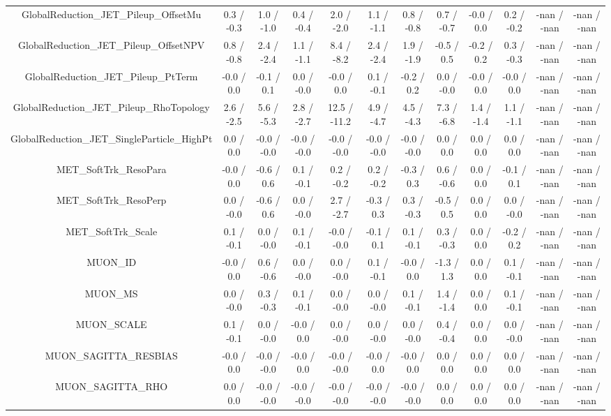 \begin{table}[htbp]
\begin{center}
\begin{tabular}{|c|c|c|c|c|c|c|c|c|c|c|c|}
  GlobalReduction_JET_Pileup_OffsetMu & 0.3 / -0.3 & 1.0 / -1.0 & 0.4 / -0.4 & 2.0 / -2.0 & 1.1 / -1.1 & 0.8 / -0.8 & 0.7 / -0.7 & -0.0 / 0.0 & 0.2 / -0.2 & -nan / -nan & -nan / -nan \\ 
  GlobalReduction_JET_Pileup_OffsetNPV & 0.8 / -0.8 & 2.4 / -2.4 & 1.1 / -1.1 & 8.4 / -8.2 & 2.4 / -2.4 & 1.9 / -1.9 & -0.5 / 0.5 & -0.2 / 0.2 & 0.3 / -0.3 & -nan / -nan & -nan / -nan \\ 
  GlobalReduction_JET_Pileup_PtTerm & -0.0 / 0.0 & -0.1 / 0.1 & 0.0 / -0.0 & -0.0 / 0.0 & 0.1 / -0.1 & -0.2 / 0.2 & 0.0 / -0.0 & -0.0 / 0.0 & -0.0 / 0.0 & -nan / -nan & -nan / -nan \\ 
  GlobalReduction_JET_Pileup_RhoTopology & 2.6 / -2.5 & 5.6 / -5.3 & 2.8 / -2.7 & 12.5 / -11.2 & 4.9 / -4.7 & 4.5 / -4.3 & 7.3 / -6.8 & 1.4 / -1.4 & 1.1 / -1.1 & -nan / -nan & -nan / -nan \\ 
  GlobalReduction_JET_SingleParticle_HighPt & 0.0 / 0.0 & -0.0 / -0.0 & -0.0 / -0.0 & -0.0 / -0.0 & -0.0 / -0.0 & -0.0 / -0.0 & 0.0 / 0.0 & 0.0 / 0.0 & 0.0 / 0.0 & -nan / -nan & -nan / -nan \\ 
  MET_SoftTrk_ResoPara & -0.0 / 0.0 & -0.6 / 0.6 & 0.1 / -0.1 & 0.2 / -0.2 & 0.2 / -0.2 & -0.3 / 0.3 & 0.6 / -0.6 & 0.0 / 0.0 & -0.1 / 0.1 & -nan / -nan & -nan / -nan \\ 
  MET_SoftTrk_ResoPerp & 0.0 / -0.0 & -0.6 / 0.6 & 0.0 / -0.0 & 2.7 / -2.7 & -0.3 / 0.3 & 0.3 / -0.3 & -0.5 / 0.5 & 0.0 / 0.0 & 0.0 / -0.0 & -nan / -nan & -nan / -nan \\ 
  MET_SoftTrk_Scale & 0.1 / -0.1 & 0.0 / -0.0 & 0.1 / -0.1 & -0.0 / -0.0 & -0.1 / 0.1 & 0.1 / -0.1 & 0.3 / -0.3 & 0.0 / 0.0 & -0.2 / 0.2 & -nan / -nan & -nan / -nan \\ 
  MUON_ID & -0.0 / 0.0 & 0.6 / -0.6 & 0.0 / -0.0 & 0.0 / -0.0 & 0.1 / -0.1 & -0.0 / 0.0 & -1.3 / 1.3 & 0.0 / 0.0 & 0.1 / -0.1 & -nan / -nan & -nan / -nan \\ 
  MUON_MS & 0.0 / -0.0 & 0.3 / -0.3 & 0.1 / -0.1 & 0.0 / -0.0 & 0.0 / -0.0 & 0.1 / -0.1 & 1.4 / -1.4 & 0.0 / 0.0 & 0.1 / -0.1 & -nan / -nan & -nan / -nan \\ 
  MUON_SCALE & 0.1 / -0.1 & 0.0 / -0.0 & -0.0 / 0.0 & 0.0 / -0.0 & 0.0 / -0.0 & 0.0 / -0.0 & 0.4 / -0.4 & 0.0 / 0.0 & 0.0 / -0.0 & -nan / -nan & -nan / -nan \\ 
  MUON_SAGITTA_RESBIAS & -0.0 / 0.0 & -0.0 / -0.0 & -0.0 / 0.0 & -0.0 / -0.0 & -0.0 / 0.0 & -0.0 / 0.0 & 0.0 / 0.0 & 0.0 / 0.0 & 0.0 / 0.0 & -nan / -nan & -nan / -nan \\ 
  MUON_SAGITTA_RHO & 0.0 / 0.0 & -0.0 / -0.0 & -0.0 / -0.0 & -0.0 / -0.0 & -0.0 / -0.0 & -0.0 / -0.0 & 0.0 / 0.0 & 0.0 / 0.0 & 0.0 / 0.0 & -nan / -nan & -nan / -nan \\ 

\end{tabular}
\end{center}
\end{table}
